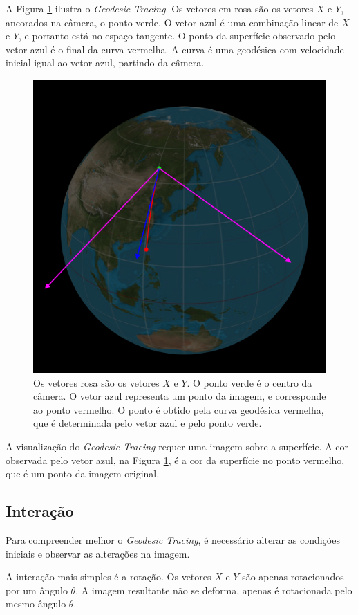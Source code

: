 A Figura \ref{img:geotracing} ilustra o \textit{Geodesic Tracing}.
Os vetores em rosa são os vetores $X$ e $Y$, ancorados na câmera, o ponto verde.
O vetor azul é uma combinação linear de $X$ e $Y$, e portanto está no espaço tangente.
O ponto da superfície observado pelo vetor azul é o final da curva vermelha.
A curva é uma geodésica com velocidade inicial igual ao vetor azul, partindo da câmera.

\begin{figure}[!ht]
    \centering
    \includegraphics[width=0.6\linewidth, frame]{geotracing.png}
    \caption[Ilustração do \textit{Geodesic Tracing}]{
    Os vetores rosa são os vetores $X$ e $Y$.
    O ponto verde é o centro da câmera. O vetor azul representa um ponto
    da imagem, e corresponde ao ponto vermelho. O ponto é obtido pela curva geodésica
    vermelha, que é determinada pelo vetor azul e pelo ponto verde.}
    \label{img:geotracing}
\end{figure}

A visualização do \textit{Geodesic Tracing} requer uma imagem sobre a superfície.
A cor observada pelo vetor azul, na Figura \ref{img:geotracing}, é a cor da superfície
no ponto vermelho, que é um ponto da imagem original.

\subsection{Interação}
Para compreender melhor o \textit{Geodesic Tracing},
é necessário alterar as condições iniciais e observar as alterações na imagem.

A interação mais simples é a rotação.
Os vetores $X$ e $Y$ são apenas rotacionados por um ângulo $\theta$.
A imagem resultante não se deforma, apenas é rotacionada pelo mesmo ângulo $\theta$.

